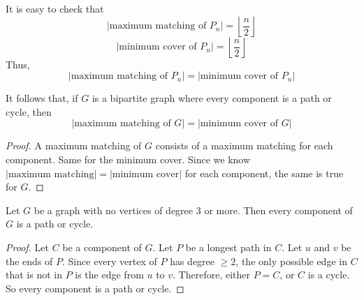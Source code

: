It is easy to check that
\[ |\text{maximum matching of }P_n|=\left\lfloor \frac{n}{2} \right\rfloor \]
\[ |\text{minimum cover of }P_n|=\left\lfloor \frac{n}{2} \right\rfloor \]
Thus,
\[ |\text{maximum matching of }P_n|=|\text{minimum cover of }P_n| \]

It follows that, if $ G $ is a bipartite graph where every component is a path or cycle,
then
\[ |\text{maximum matching of }G|=|\text{minimum cover of }G|  \]
\begin{proof}
    A maximum matching of $ G $ consists of a maximum matching for each component. Same for
    the minimum cover. Since we know $ |\text{maximum matching}|=|\text{minimum cover}| $
    for each component, the same is true for $ G $.
\end{proof}

\begin{thmbox}
    \begin{prop}
        Let $ G $ be a graph with no vertices of degree $ 3 $ or more. Then
        every component of $ G $ is a path or cycle.
    \end{prop}
\end{thmbox}
\begin{proof}
    Let $ C $ be a component of $ G $. Let $ P $ be a longest path
    in $ C $. Let $ u $ and $ v $ be the ends of $ P $. Since every vertex
    of $ P $ has degree $ \geqslant 2 $, the only possible edge in $ C $ that is
    not in $ P $ is the edge from $ u $ to $ v $. Therefore, either
    $ P=C $, or $ C $ is a cycle. So every component is a path or cycle.
\end{proof}

